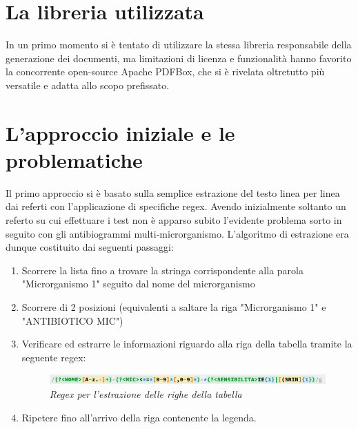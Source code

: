 \section{La libreria utilizzata}
In un primo momento si è tentato di utilizzare la stessa libreria responsabile della generazione dei documenti, ma limitazioni di licenza e funzionalità hanno favorito la concorrente open-source Apache PDFBox, che si è rivelata oltretutto più versatile e adatta allo scopo prefissato.
\section{L'approccio iniziale e le problematiche}
Il primo approccio si è basato sulla semplice estrazione del testo linea per linea dai referti con l'applicazione di specifiche regex. 
Avendo inizialmente soltanto un referto su cui effettuare i test non è apparso subito l'evidente problema sorto in seguito con gli antibiogrammi multi-microrganismo.
L'algoritmo di estrazione era dunque costituito dai seguenti passaggi:
\begin{enumerate}
\item Scorrere la lista fino a trovare la stringa corrispondente alla parola "Microrganismo 1" seguito dal nome del microrganismo
\item Scorrere di 2 posizioni (equivalenti a saltare la riga "Microrganismo 1" e "ANTIBIOTICO MIC")
\newpage
\item Verificare ed estrarre le informazioni riguardo alla riga della tabella tramite la seguente regex:
\begin{figure}[h!]
	\centering
	\includegraphics[width=.99\columnwidth]{images/regex.png}
	\caption{\textit{Regex per l'estrazione delle righe della tabella}}
	\label{fig:content_multi_1}
\end{figure}
\item Ripetere fino all'arrivo della riga contenente la legenda.
\end{enumerate}


